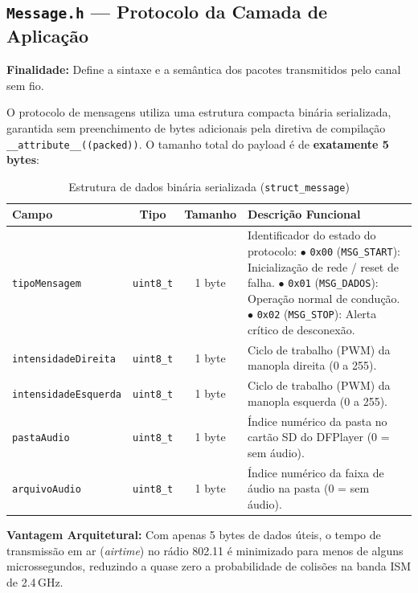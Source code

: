 \documentclass[12pt,a4paper]{article}
\begin{document}
\subsection{\texttt{Message.h} --- Protocolo da Camada de Aplicação}
\textbf{Finalidade:} Define a sintaxe e a semântica dos pacotes transmitidos pelo canal sem fio.

O protocolo de mensagens utiliza uma estrutura compacta binária serializada, garantida sem preenchimento de bytes adicionais pela diretiva de compilação \texttt{\_\_attribute\_\_((packed))}. O tamanho total do payload é de \textbf{exatamente 5 bytes}:

\begin{table}[H]
    \centering
    \caption{Estrutura de dados binária serializada (\texttt{struct\_message})}
    \label{tab:protocolo_mensagem}
    \begin{tabularx}{\textwidth}{lccX}
        \toprule
        \textbf{Campo} & \textbf{Tipo} & \textbf{Tamanho} & \textbf{Descrição Funcional} \\
        \midrule
        \texttt{tipoMensagem} & \texttt{uint8\_t} & 1 byte & Identificador do estado do protocolo: \newline
        $\bullet$ \texttt{0x00} (\texttt{MSG\_START}): Inicialização de rede / reset de falha. \newline
        $\bullet$ \texttt{0x01} (\texttt{MSG\_DADOS}): Operação normal de condução. \newline
        $\bullet$ \texttt{0x02} (\texttt{MSG\_STOP}): Alerta crítico de desconexão. \\
        \texttt{intensidadeDireita} & \texttt{uint8\_t} & 1 byte & Ciclo de trabalho (PWM) da manopla direita (0 a 255). \\
        \texttt{intensidadeEsquerda} & \texttt{uint8\_t} & 1 byte & Ciclo de trabalho (PWM) da manopla esquerda (0 a 255). \\
        \texttt{pastaAudio} & \texttt{uint8\_t} & 1 byte & Índice numérico da pasta no cartão SD do DFPlayer (0 = sem áudio). \\
        \texttt{arquivoAudio} & \texttt{uint8\_t} & 1 byte & Índice numérico da faixa de áudio na pasta (0 = sem áudio). \\
        \bottomrule
    \end{tabularx}
\end{table}

\textbf{Vantagem Arquitetural:} Com apenas 5 bytes de dados úteis, o tempo de transmissão em ar (\textit{airtime}) no rádio 802.11 é minimizado para menos de alguns microssegundos, reduzindo a quase zero a probabilidade de colisões na banda ISM de 2.4\,GHz.
\end{document}
